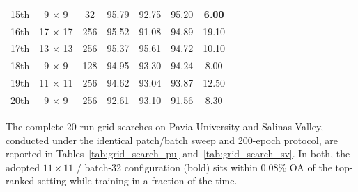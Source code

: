 \documentclass[manuscript,screen,review]{acmart}
\begin{document}
\begin{table}[t]
\begin{tabular*}{\textwidth}{@{\extracolsep{\fill}}ccccccc}
15th & 9 $\times$ 9            & 32           & 95.79          & 92.75          & 95.20          & \textbf{6.00}  \\
16th & 17 $\times$ 17          & 256          & 95.52          & 91.08          & 94.89          & 19.10 \\
17th & 13 $\times$ 13          & 256          & 95.37          & 95.61          & 94.72          & 10.10 \\
18th & 9 $\times$ 9            & 128          & 94.95          & 93.30          & 94.24          & 8.00  \\
19th & 11 $\times$ 11          & 256          & 94.62          & 93.04          & 93.87          & 12.50 \\
20th & 9 $\times$ 9            & 256          & 92.61          & 93.10          & 91.56          & 8.30  \\
\bottomrule
\end{tabular*}
\end{table}

The complete 20-run grid searches on Pavia University and Salinas Valley, conducted under the identical patch/batch sweep and 200-epoch protocol, are reported in Tables~\ref{tab:grid_search_pu} and~\ref{tab:grid_search_sv}. In both, the adopted $11 \times 11$ / batch-32 configuration (bold) sits within 0.08\% OA of the top-ranked setting while training in a fraction of the time.
\end{document}
